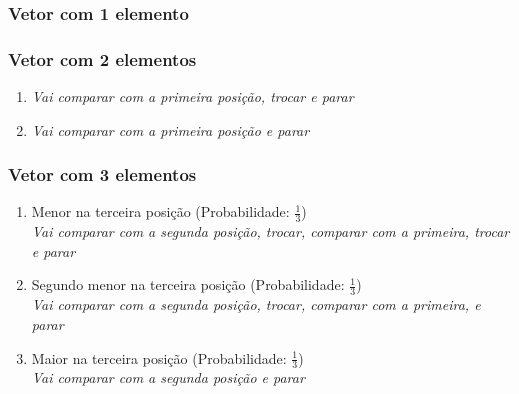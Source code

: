 \documentclass{article}
\begin{document}
    
    \subsubsection{Vetor com 1 elemento}
    \indent {}
    
    
    \subsubsection{Vetor com 2 elementos}
    \begin{enumerate}
    \item {}
        \textit{Vai comparar com a primeira posição, trocar e parar}
    
    \item {}
        \textit{Vai comparar com a primeira posição e parar}
    \end{enumerate}
    
    
    
    \subsubsection{Vetor com 3 elementos}
    \begin{enumerate}
    \item {Menor na terceira posição (Probabilidade: $\frac{1}{3}$)\\}
        \textit{Vai comparar com a segunda posição, trocar, comparar com a primeira, trocar e parar\\}
    \item {Segundo menor na terceira posição (Probabilidade: $\frac{1}{3}$)\\}
        \textit{Vai comparar com a segunda posição, trocar, comparar com a primeira, e parar\\}
    \item {Maior na terceira posição (Probabilidade: $\frac{1}{3}$)\\}
        \textit{Vai comparar com a segunda posição e parar\\}
    \end{enumerate}
    
\end{document}
